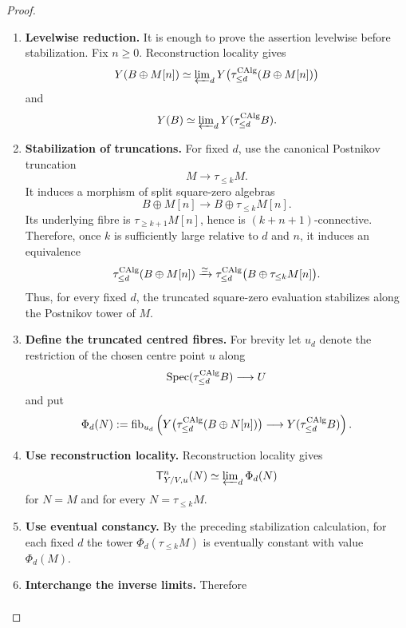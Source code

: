 \begin{proof}
\leavevmode
\begin{enumerate}[label=\textup{(\arabic*)}]
    \item \textbf{Levelwise reduction.}
    It is enough to prove the assertion levelwise before stabilization. Fix
    \(n\geq0\). Reconstruction locality gives
    \[
        Y(B\oplus M[n])
        \simeq
        \varprojlim\nolimits_d
        Y\bigl(\tau_{\leq d}^{\operatorname{CAlg}}(B\oplus M[n])\bigr)
    \]
    and
    \[
        Y(B)
        \simeq
        \varprojlim\nolimits_dY(\tau_{\leq d}^{\operatorname{CAlg}}B).
    \]
    \item \textbf{Stabilization of truncations.}
    For fixed \(d\), use the canonical Postnikov truncation
    \[
        M\longrightarrow\tau_{\leq k}M.
    \]
    It induces a morphism of split square-zero algebras
    \[
        B\oplus M[n]
        \longrightarrow
        B\oplus\tau_{\leq k}M[n].
    \]
    Its underlying fibre is \(\tau_{\geq k+1}M[n]\), hence is
    \((k+n+1)\)-connective. Therefore, once \(k\) is sufficiently large relative
    to \(d\) and \(n\), it induces an equivalence
    \[
        \tau_{\leq d}^{\operatorname{CAlg}}(B\oplus M[n])
        \xrightarrow{\simeq}
        \tau_{\leq d}^{\operatorname{CAlg}}
        \bigl(B\oplus\tau_{\leq k}M[n]\bigr).
    \]
    Thus, for every fixed \(d\), the truncated square-zero evaluation stabilizes
    along the Postnikov tower of \(M\).
    \item \textbf{Define the truncated centred fibres.}
    For brevity let \(u_d\) denote the restriction of the chosen centre point
    \(u\) along
    \[
        \operatorname{Spec}(\tau_{\leq d}^{\operatorname{CAlg}}B)\longrightarrow U
    \]
    and put
    \[
        \Phi_d(N)
        :=
        \operatorname{fib}_{u_d}
        \left(
            Y\bigl(\tau_{\leq d}^{\operatorname{CAlg}}(B\oplus N[n])\bigr)
            \longrightarrow
            Y(\tau_{\leq d}^{\operatorname{CAlg}}B)
        \right).
    \]
    \item \textbf{Use reconstruction locality.}
    Reconstruction locality gives
    \[
        \mathsf T^n_{Y/V,u}(N)
        \simeq
        \varprojlim\nolimits_d\Phi_d(N)
    \]
    for \(N=M\) and for every \(N=\tau_{\leq k}M\).
    \item \textbf{Use eventual constancy.}
    By the preceding
    stabilization calculation, for each fixed \(d\) the tower
    \(\Phi_d(\tau_{\leq k}M)\) is eventually constant with value
    \(\Phi_d(M)\).
    \item \textbf{Interchange the inverse limits.}
    Therefore
    \[
    \begin{aligned}

\end{aligned}\]
\end{enumerate}
\end{proof}
